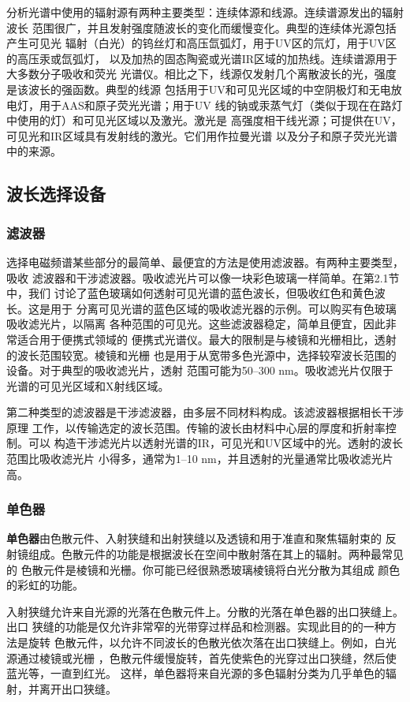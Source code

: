分析光谱中使用的辐射源有两种主要类型：连续体源和线源。连续谱源发出的辐射波长
范围很广，并且发射强度随波长的变化而缓慢变化。典型的连续体光源包括产生可见光
辐射（白光）的钨丝灯和高压氙弧灯，用于UV区的氘灯，用于UV区的高压汞或氙弧灯，
以及加热的固态陶瓷或光谱IR区域的加热线。连续谱源用于大多数分子吸收和荧光
光谱仪。相比之下，线源仅发射几个离散波长的光，强度是该波长的强函数。典型的线源
包括用于UV和可见光区域的中空阴极灯和无电放电灯，用于AAS和原子荧光光谱；用于UV
线的钠或汞蒸气灯（类似于现在在路灯中使用的灯）和可见光区域以及激光。激光是
高强度相干线光源；可提供在UV，可见光和IR区域具有发射线的激光。它们用作拉曼光谱
以及分子和原子荧光光谱中的来源。
\subsection{波长选择设备}
\subsubsection{滤波器}
选择电磁频谱某些部分的最简单、最便宜的方法是使用滤波器。有两种主要类型，吸收
滤波器和干涉滤波器。吸收滤光片可以像一块彩色玻璃一样简单。在第2.1节中，我们
讨论了蓝色玻璃如何透射可见光谱的蓝色波长，但吸收红色和黄色波长。这是用于
分离可见光谱的蓝色区域的吸收滤光器的示例。可以购买有色玻璃吸收滤光片，以隔离
各种范围的可见光。这些滤波器稳定，简单且便宜，因此非常适合用于便携式领域的
便携式光谱仪。最大的限制是与棱镜和光栅相比，透射的波长范围较宽。棱镜和光栅
也是用于从宽带多色光源中，选择较窄波长范围的设备。对于典型的吸收滤光片，透射
范围可能为50--300 nm。吸收滤光片仅限于光谱的可见光区域和X射线区域。

第二种类型的滤波器是干涉滤波器，由多层不同材料构成。该滤波器根据相长干涉原理
工作，以传输选定的波长范围。传输的波长由材料中心层的厚度和折射率控制。可以
构造干涉滤光片以透射光谱的IR，可见光和UV区域中的光。透射的波长范围比吸收滤光片
小得多，通常为1--10 nm，并且透射的光量通常比吸收滤光片高。
\subsubsection{单色器}
{\bf 单色器}由色散元件、入射狭缝和出射狭缝以及透镜和用于准直和聚焦辐射束的
反射镜组成。色散元件的功能是根据波长在空间中散射落在其上的辐射。两种最常见的
色散元件是棱镜和光栅。你可能已经很熟悉玻璃棱镜将白光分散为其组成
颜色的彩虹的功能。

入射狭缝允许来自光源的光落在色散元件上。分散的光落在单色器的出口狭缝上。出口
狭缝的功能是仅允许非常窄的光带穿过样品和检测器。实现此目的的一种方法是旋转
色散元件，以允许不同波长的色散光依次落在出口狭缝上。例如，白光源通过棱镜或光栅
，色散元件缓慢旋转，首先使紫色的光穿过出口狭缝，然后使蓝光等，一直到红光。
这样，单色器将来自光源的多色辐射分类为几乎单色的辐射，并离开出口狭缝。

